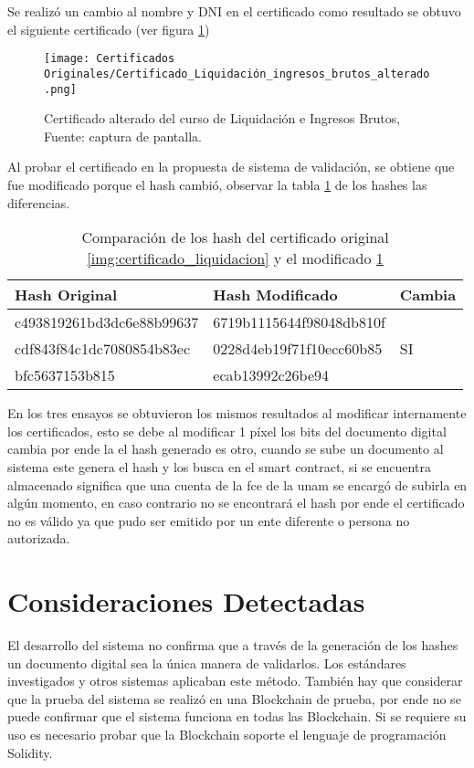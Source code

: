 Se realizó un cambio al nombre y DNI en el certificado como resultado se obtuvo el siguiente certificado (ver figura \ref{img:certificado_liquidacion_alterado})  

\begin{figure}[H]
  \centering
  {\texttt{[image: Certificados Originales/Certificado\_Liquidación\_ingresos\_brutos\_alterado.png]}}
  \caption{Certificado alterado del curso de Liquidación e Ingresos Brutos,  Fuente: captura de pantalla. }
  \label{img:certificado_liquidacion_alterado}
\end{figure}

Al probar el certificado en la propuesta de sistema de validación, se obtiene que fue modificado porque el hash cambió,  
observar la tabla \ref{table:tabla-ensayo-c} de los hashes las diferencias.

\begin{table}[H]
  \centering
  \begin{tabular}{ |l|l|l| }
  \hline
  Hash Original              & Hash Modificado          & Cambia \\
  \hline
  c493819261bd3dc6e88b99637 & 6719b1115644f98048db810f  &    \\
  cdf843f84c1dc7080854b83ec & 0228d4eb19f71f10ecc60b85  & SI \\
  bfc5637153b815            & ecab13992c26be94          &    \\
  \hline
  \end{tabular}
  \caption{Comparación de los hash del certificado original \ref{img:certificado_liquidacion} y el modificado \ref{img:certificado_liquidacion_alterado}  }
  \label{table:tabla-ensayo-c}
  \end{table}

En los tres ensayos se obtuvieron los mismos resultados al modificar internamente los certificados, esto se debe al modificar 1 píxel los bits del 
documento digital cambia por ende la el hash generado es otro, cuando se sube un documento al sistema este genera el hash y los busca en 
el smart contract, si se encuentra almacenado significa que una cuenta de la \gls{fce} de la \gls{unam} se encargó de subirla en algún momento,
en caso contrario no se encontrará el hash por ende el certificado no es válido ya que pudo ser emitido por un ente diferente o persona no autorizada.

\section{Consideraciones Detectadas}
El desarrollo del sistema no confirma que a través de la generación de los hashes  un documento digital sea la única manera de validarlos. 
Los estándares investigados y otros sistemas aplicaban este método.
También hay que considerar que la prueba del sistema se realizó en una  Blockchain de prueba, por ende no se puede confirmar que el sistema funciona en todas las Blockchain. 
Si se requiere su uso es necesario probar que la  Blockchain soporte el lenguaje de programación Solidity.

